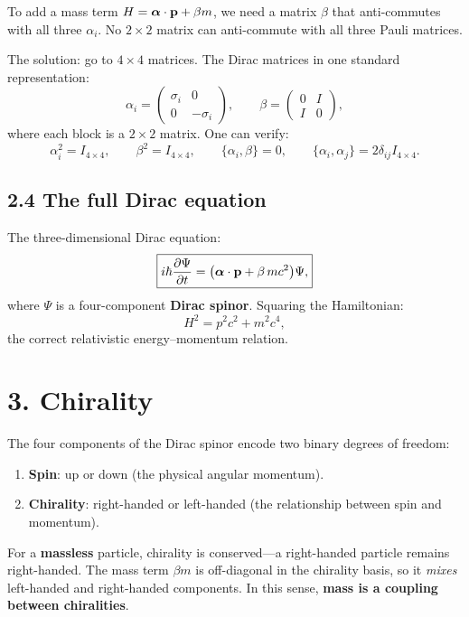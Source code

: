 \documentclass[12pt,a4paper]{article}
\begin{document}
To add a mass term $H = \vb*{\alpha}\cdot\vb{p} + \beta m$, we need a matrix $\beta$ that anti-commutes with all three $\alpha_i$.  No $2\times 2$ matrix can anti-commute with all three Pauli matrices.

The solution: go to $4\times 4$ matrices.  The Dirac matrices in one standard representation:
\[
    \alpha_i = \begin{pmatrix} \sigma_i & 0 \\ 0 & -\sigma_i \end{pmatrix}, \qquad
    \beta = \begin{pmatrix} 0 & I \\ I & 0 \end{pmatrix},
\]
where each block is a $2\times 2$ matrix.  One can verify:
\[
    \alpha_i^2 = I_{4\times 4}, \qquad \beta^2 = I_{4\times 4}, \qquad \{\alpha_i, \beta\} = 0, \qquad \{\alpha_i, \alpha_j\} = 2\delta_{ij}I_{4\times 4}.
\]

\subsection{2.4 The full Dirac equation}

The three-dimensional Dirac equation:
\[
    \boxed{i\hbar\frac{\partial\Psi}{\partial t} = \bigl(\vb*{\alpha}\cdot\vb{p} + \beta\, mc^2\bigr)\Psi,}
\]
where $\Psi$ is a four-component \textbf{Dirac spinor}.  Squaring the Hamiltonian:
\[
    H^2 = p^2c^2 + m^2c^4,
\]
the correct relativistic energy--momentum relation.

\section{3. Chirality}

The four components of the Dirac spinor encode two binary degrees of freedom:
\begin{enumerate}[nosep]
    \item \textbf{Spin}: up or down (the physical angular momentum).
    \item \textbf{Chirality}: right-handed or left-handed (the relationship between spin and momentum).
\end{enumerate}

For a \textbf{massless} particle, chirality is conserved---a right-handed particle remains right-handed.  The mass term $\beta m$ is off-diagonal in the chirality basis, so it \emph{mixes} left-handed and right-handed components.  In this sense, \textbf{mass is a coupling between chiralities}.
\end{document}
